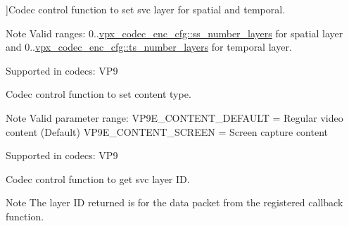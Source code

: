 \begin{Desc}
\begin{description}
{}]Codec control function to set svc layer for spatial and temporal. \begin{DoxyNote}{Note}
Valid ranges\+: 0..\hyperlink{structvpx__codec__enc__cfg_a1e5e1d00b22f2ba8c5c7230f31900f95}{vpx\+\_\+codec\+\_\+enc\+\_\+cfg\+::ss\+\_\+number\+\_\+layers} for spatial layer and 0..\hyperlink{structvpx__codec__enc__cfg_a16d4549a30cbd585e3c3056ef873d8c7}{vpx\+\_\+codec\+\_\+enc\+\_\+cfg\+::ts\+\_\+number\+\_\+layers} for temporal layer.
\end{DoxyNote}
Supported in codecs\+: V\+P9 \item[{\em 
V\+P9\+E\+\_\+\+S\+E\+T\+\_\+\+T\+U\+N\+E\+\_\+\+C\+O\+N\+T\+E\+NT\hypertarget{group__vp8__encoder_gga6deae3d561c838952552c3d3756322eca87292610b42f00676aebdc75b63227de}{}\label{group__vp8__encoder_gga6deae3d561c838952552c3d3756322eca87292610b42f00676aebdc75b63227de}
}]Codec control function to set content type. \begin{DoxyNote}{Note}
Valid parameter range\+: V\+P9\+E\+\_\+\+C\+O\+N\+T\+E\+N\+T\+\_\+\+D\+E\+F\+A\+U\+LT = Regular video content (Default) V\+P9\+E\+\_\+\+C\+O\+N\+T\+E\+N\+T\+\_\+\+S\+C\+R\+E\+EN = Screen capture content
\end{DoxyNote}
Supported in codecs\+: V\+P9 \item[{\em 
V\+P9\+E\+\_\+\+G\+E\+T\+\_\+\+S\+V\+C\+\_\+\+L\+A\+Y\+E\+R\+\_\+\+ID\hypertarget{group__vp8__encoder_gga6deae3d561c838952552c3d3756322ecae5198050ccb3c1aed11fee8a9fb3be18}{}\label{group__vp8__encoder_gga6deae3d561c838952552c3d3756322ecae5198050ccb3c1aed11fee8a9fb3be18}
}]Codec control function to get svc layer ID. \begin{DoxyNote}{Note}
The layer ID returned is for the data packet from the registered callback function.

\end{DoxyNote}
\end{description}
\end{Desc}

